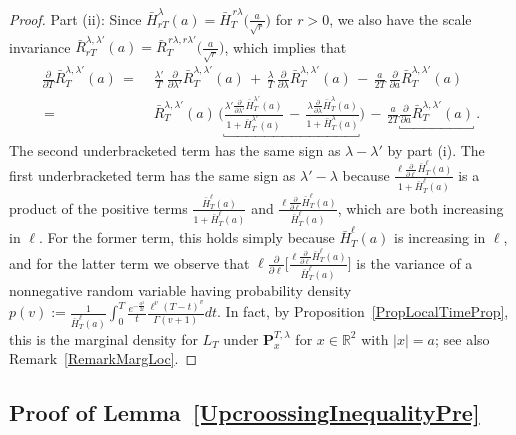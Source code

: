 \documentclass[10pt]{article}
\numberwithin{equation}{section}
\theoremstyle{definition}
\newcommand{\R}{{\mathbb R}}
\begin{document}
\begin{proof}
\noindent Part (ii): Since $\bar{H}_{rT}^{\lambda}( a)=\bar{H}_{T }^{\,r\lambda}\big(\frac{a}{\sqrt{r}}\big)$ for $r>0$, we also have the scale invariance $\bar{R}^{\lambda,\lambda'}_{rT}(a)=\bar{R}^{\,r\lambda,r\lambda'}_{ T}\big(\frac{a}{\sqrt{r}} \big)$, which implies that
\begin{align*}
\frac{\partial}{\partial T}  \bar{R}^{\lambda,\lambda'}_{T}(a)\,=\,&\, \frac{\lambda'}{T}\,\frac{\partial}{\partial \lambda' } \bar{R}^{\lambda,\lambda'}_{T}(a) \,+\,\frac{\lambda}{T}\,\frac{\partial}{\partial \lambda } \bar{R}^{\lambda,\lambda'}_{T}(a)\, -\,\frac{a}{2T}\,\frac{\partial}{\partial a} \bar{R}^{\lambda,\lambda'}_{T}(a) 
\nonumber   \\
\,=\,&\,\bar{R}^{\lambda,\lambda'}_{T}(a) \,\Bigg(\underbracket{\frac{\lambda' \frac{\partial}{\partial \lambda'}\bar{H}_{T}^{\lambda'}( a) }{1+\bar{H}_{T}^{\lambda'}( a)  }  \,   -\,\frac{\lambda \frac{\partial}{\partial \lambda}\bar{H}_{T}^{\lambda}( a) }{1+\bar{H}_{T}^{\lambda}( a)  } }\Bigg)   \, -\,\frac{a}{2T}\underbracket{\frac{\partial}{\partial a} \bar{R}^{\lambda,\lambda'}_{T}(a)}\,. \nonumber 
\end{align*}
The second underbracketed term has the same sign as $\lambda-\lambda'$ by part (i).  The first underbracketed term has the same sign as $\lambda'-\lambda$ because $\frac{\ell \frac{\partial}{\partial \ell}\bar{H}_{T}^{\ell}( a) }{1+\bar{H}_{T}^{\ell}( a)  } $ is a product of the positive terms $\frac{\bar{H}_{T}^{\ell}( a) }{1+\bar{H}_{T}^{\ell}( a)  } $ and $\frac{\ell \frac{\partial}{\partial \ell}\bar{H}_{T}^{\ell}( a) }{\bar{H}_{T}^{\ell}( a)  } $, which are both increasing in $\ell$. For the former term, this  holds simply because $\bar{H}_{T}^{\ell}( a)$ is increasing in $\ell$, and for the latter term we observe that $ \ell \frac{\partial}{\partial \ell}\big[\frac{\ell \frac{\partial}{\partial \ell}\bar{H}_{T}^{\ell}( a) }{\bar{H}_{T}^{\ell}( a)  }\big] $ is the variance of a nonnegative random variable having probability density 
$ p(v) := \frac{1}{\bar{H}_{T}^{\ell}( a) } \int_0^T \frac{  e^{-\frac{a^2}{2t}  }  }{ t } \frac{ \ell^v(T-t)^v }{ \Gamma(v+1) }  dt  $. In fact, by Proposition~\ref{PropLocalTimeProp}, this is the marginal density for $L_T$ under $\mathbf{P}_{x}^{T,\lambda}$ for $x\in \R^2$ with $|x|=a$; see also Remark~\ref{RemarkMargLoc}.
\end{proof}






\subsection{Proof of Lemma~\ref{UpcroossingInequalityPre}} \label{SubsectionUpcroossingInequalityPre}
\end{document}
